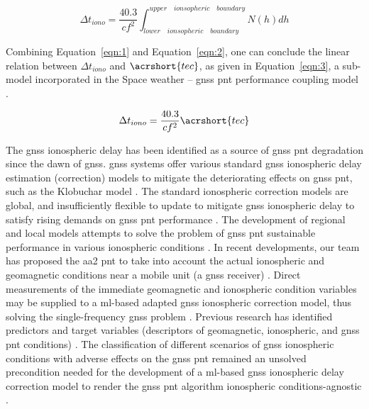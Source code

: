 \documentclass[sn-mathphys-num]{sn-jnl}%
\begin{document}
\begin{equation}
	\Delta t_{iono} = \frac{40.3}{c f^{2}} \int_{lower \quad ionsopheric \quad boundary}^{upper \quad ionsopheric \quad boundary}N(h)dh
	\label{eqn:2}
\end{equation}

Combining Equation~\ref{eqn:1} and Equation~\ref{eqn:2}, one can conclude the linear relation between $\Delta t_{iono}$ and $\acrshort{tec}$, as given in Equation~\ref{eqn:3}, a sub-model incorporated in the Space weather – \acrshort{gnss} \acrshort{pnt} performance coupling model \cite{filic2018modelling}.

\begin{equation}
	\Delta t_{iono} = \frac{40.3}{c f^{2}} \acrshort{tec}
	\label{eqn:3}
\end{equation}

The \acrshort{gnss} ionospheric delay has been identified as a source of \acrshort{gnss} \acrshort{pnt} degradation since the dawn of \acrshort{gnss}. \acrshort{gnss} systems offer various standard \acrshort{gnss} ionospheric delay estimation (correction) models to mitigate the deteriorating effects on \acrshort{gnss} \acrshort{pnt}, such as the Klobuchar model \cite{spilker1996global, filic2018modelling}. The standard ionospheric correction models are global, and insufficiently flexible to update to mitigate \acrshort{gnss} ionospheric delay to satisfy rising demands on \acrshort{gnss} \acrshort{pnt} performance \cite{filjar2024ambient, filic2018modelling}. The development of regional and local models attempts to solve the problem of \acrshort{gnss} \acrshort{pnt} sustainable performance in various ionospheric conditions \cite{sikirica2021risk}. In recent developments, our team has proposed the \acrfull{aa2} \acrshort{pnt} to take into account the actual ionospheric and geomagnetic conditions near a mobile unit (a \acrshort{gnss} receiver) \cite{filjar2022application, filic2018modelling, filjar2024ambient}. Direct measurements of the immediate geomagnetic and ionospheric condition variables may be supplied to a \acrlong{ml}-based adapted \acrshort{gnss} ionospheric correction model, thus solving the single-frequency \acrshort{gnss} problem \cite{filjar2022application}. Previous research has identified predictors and target variables (descriptors of geomagnetic, ionospheric, and \acrshort{gnss} \acrshort{pnt} conditions) \cite{filic2018modelling, natras2022ensemble, natras2023regional}. The classification of different scenarios of \acrshort{gnss} ionospheric conditions with adverse effects on the \acrshort{gnss} \acrshort{pnt} remained an unsolved precondition needed for the development of a \acrlong{ml}-based \acrshort{gnss} ionospheric delay correction model to render the \acrshort{gnss} \acrshort{pnt} algorithm ionospheric conditions-agnostic \cite{filjar2022application, filjar2024ambient}.
\end{document}
